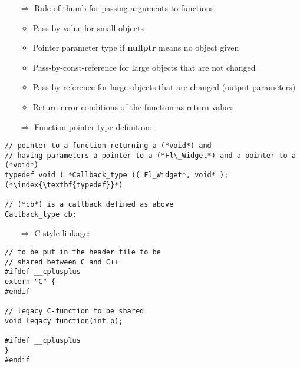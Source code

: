\documentclass[10pt]{article}
\begin{document}
\begin{enumerate}
\item[$\Rightarrow$] Rule of thumb for passing arguments to functions:
\begin{itemize}
\item Pass-by-value for small objects
\item Pointer parameter type if \textbf{nullptr} means no object given
\item Pass-by-const-reference for large objects that are not changed
\item Pass-by-reference for large objects that are changed (output parameters)
\item Return error conditions of the function as return values
\end{itemize}
\end{enumerate}
\begin{enumerate}
\item[$\Rightarrow$] Function pointer type definition:
\end{enumerate}
\begin{lstlisting}
// pointer to a function returning a (*void*) and
// having parameters a pointer to a (*Fl\_Widget*) and a pointer to a (*void*)
typedef void ( *Callback_type )( Fl_Widget*, void* ); (*\index{\textbf{typedef}}*)

// (*cb*) is a callback defined as above
Callback_type cb;
\end{lstlisting}
\begin{enumerate}
\item[$\Rightarrow$] C-style linkage:
\end{enumerate}
\begin{lstlisting}
// to be put in the header file to be
// shared between C and C++
#ifdef __cplusplus
extern "C" {
#endif

// legacy C-function to be shared
void legacy_function(int p);

#ifdef __cplusplus
}
#endif
\end{lstlisting}
%
%
\end{document}
